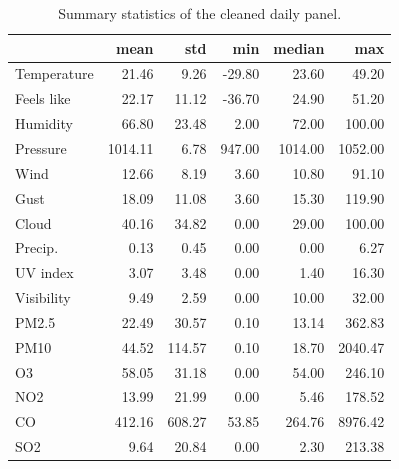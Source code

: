 \begin{table}
\caption{Summary statistics of the cleaned daily panel.}
\label{tab:summary}
\begin{tabular}{lrrrrr}
\toprule
 & mean & std & min & median & max \\
\midrule
Temperature & 21.46 & 9.26 & -29.80 & 23.60 & 49.20 \\
Feels like & 22.17 & 11.12 & -36.70 & 24.90 & 51.20 \\
Humidity & 66.80 & 23.48 & 2.00 & 72.00 & 100.00 \\
Pressure & 1014.11 & 6.78 & 947.00 & 1014.00 & 1052.00 \\
Wind & 12.66 & 8.19 & 3.60 & 10.80 & 91.10 \\
Gust & 18.09 & 11.08 & 3.60 & 15.30 & 119.90 \\
Cloud & 40.16 & 34.82 & 0.00 & 29.00 & 100.00 \\
Precip. & 0.13 & 0.45 & 0.00 & 0.00 & 6.27 \\
UV index & 3.07 & 3.48 & 0.00 & 1.40 & 16.30 \\
Visibility & 9.49 & 2.59 & 0.00 & 10.00 & 32.00 \\
PM2.5 & 22.49 & 30.57 & 0.10 & 13.14 & 362.83 \\
PM10 & 44.52 & 114.57 & 0.10 & 18.70 & 2040.47 \\
O3 & 58.05 & 31.18 & 0.00 & 54.00 & 246.10 \\
NO2 & 13.99 & 21.99 & 0.00 & 5.46 & 178.52 \\
CO & 412.16 & 608.27 & 53.85 & 264.76 & 8976.42 \\
SO2 & 9.64 & 20.84 & 0.00 & 2.30 & 213.38 \\
\bottomrule
\end{tabular}
\end{table}

